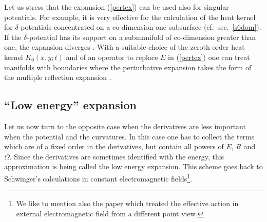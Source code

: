 Let us stress that the expansion (\ref{pertex}) can be used also
for singular potentials. For example, it is very effective for 
the calculation of the heat kernel for $\delta$-potentials
concentrated on a co-dimension one subsurface 
\cite{Gaveau:1986,Bordag:1999ed,Moss:2000gv} (cf.\ sec.\ \ref{s6dom}).
If the $\delta$-potential has its support on a submanifold
of co-dimension greater than one, the expansion diverges 
\cite{Bordag:1999ed}. 
With a suitable choice of the zeroth order heat kernel $K_0(x,y;t)$
and of an operator to replace $E$ in (\ref{pertex}) one can treat
manifolds with boundaries \cite{Bordag:2001fj} where the perturbative
expansion takes the form of the multiple reflection expansion
\cite{Balian:1970,Balian:1977za,Hansson:1983xt}.
\subsection{``Low energy'' expansion}\label{s8low}
Let us now turn to the opposite case when the derivatives are less
important when the potential and the curvatures. In this case
one has to collect the terms which are of a fixed order in the
derivatives, but contain all powers of $E$, $R$ and $\Omega$.
Since the derivatives are sometimes identified with the energy,
this approximation is being called the low energy expansion.
This scheme goes back to Schwinger's calculations
\cite{Schwinger:1951} in constant electromagnetic 
fields\footnote{We like to mention also the paper
\cite{Heisenberg:1936} which treated the effective action
in external electromagnetic field from a different point view.}.

